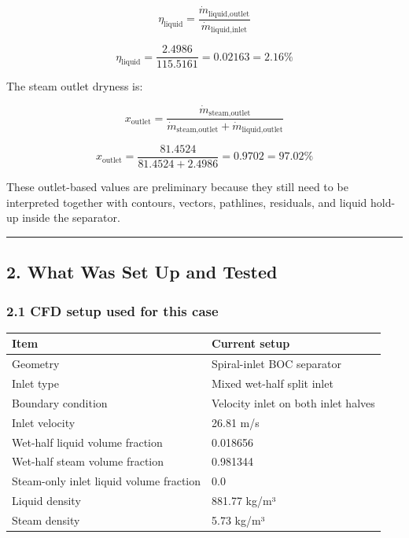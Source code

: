 \documentclass[
  11pt,
]{article}
\newcounter{none} %
\begin{document}
\[
\eta_{\text{liquid}}
=
\frac{\dot{m}_{\text{liquid,outlet}}}
{\dot{m}_{\text{liquid,inlet}}}
\]

\[
\eta_{\text{liquid}}
=
\frac{2.4986}{115.5161}
=
0.02163
=
2.16\%
\]

The steam outlet dryness is:

\[
x_{\text{outlet}}
=
\frac{\dot{m}_{\text{steam,outlet}}}
{\dot{m}_{\text{steam,outlet}} + \dot{m}_{\text{liquid,outlet}}}
\]

\[
x_{\text{outlet}}
=
\frac{81.4524}{81.4524 + 2.4986}
=
0.9702
=
97.02\%
\]

These outlet-based values are preliminary because they still need to be
interpreted together with contours, vectors, pathlines, residuals, and
liquid hold-up inside the separator.

\begin{center}\rule{0.5\linewidth}{0.5pt}\end{center}

\subsection{2. What Was Set Up and
Tested}\label{what-was-set-up-and-tested}

\subsubsection{2.1 CFD setup used for this
case}\label{cfd-setup-used-for-this-case}

{\def\LTcaptype{none} %
\begin{longtable}[]{@{}ll@{}}
\toprule\noalign{}
Item & Current setup \\
\midrule\noalign{}
\endhead
\bottomrule\noalign{}
\endlastfoot
Geometry & Spiral-inlet BOC separator \\
Inlet type & Mixed wet-half split inlet \\
Boundary condition & Velocity inlet on both inlet halves \\
Inlet velocity & 26.81 m/s \\
Wet-half liquid volume fraction & 0.018656 \\
Wet-half steam volume fraction & 0.981344 \\
Steam-only inlet liquid volume fraction & 0.0 \\
Liquid density & 881.77 kg/m³ \\
Steam density & 5.73 kg/m³ \\
\end{longtable}
}
\end{document}
